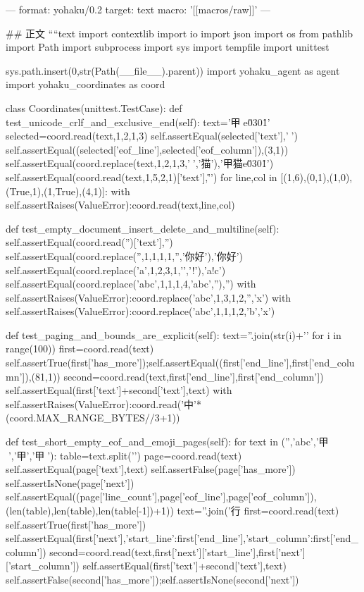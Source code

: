 ---
format: yohaku/0.2
target: text
macro: '[[macros/raw]]'
---

## 正文
````text
import contextlib
import io
import json
import os
from pathlib import Path
import subprocess
import sys
import tempfile
import unittest

sys.path.insert(0,str(Path(__file__).parent))
import yohaku_agent as agent
import yohaku_coordinates as coord


class Coordinates(unittest.TestCase):
    def test_unicode_crlf_and_exclusive_end(self):
        text='甲🧸e\u0301\r{}\n'
        selected=coord.read(text,1,2,1,3)
        self.assertEqual(selected['text'],'🧸')
        self.assertEqual((selected['eof_line'],selected['eof_column']),(3,1))
        self.assertEqual(coord.replace(text,1,2,1,3,'🧸','猫'),'甲猫e\u0301\r{}\n')
        self.assertEqual(coord.read(text,1,5,2,1)['text'],'\r\n')
        for line,col in [(1,6),(0,1),(1,0),(True,1),(1,True),(4,1)]:
            with self.assertRaises(ValueError):coord.read(text,line,col)

    def test_empty_document_insert_delete_and_multiline(self):
        self.assertEqual(coord.read('')['text'],'')
        self.assertEqual(coord.replace('',1,1,1,1,'','你好\n'),'你好\n')
        self.assertEqual(coord.replace('a\nb\nc',1,2,3,1,'\nb\n','!'),'a!c')
        self.assertEqual(coord.replace('abc',1,1,1,4,'abc',''),'')
        with self.assertRaises(ValueError):coord.replace('abc',1,3,1,2,'','x')
        with self.assertRaises(ValueError):coord.replace('abc',1,1,1,2,'b','x')

    def test_paging_and_bounds_are_explicit(self):
        text=''.join(str(i)+'\n' for i in range(100))
        first=coord.read(text)
        self.assertTrue(first['has_more']);self.assertEqual((first['end_line'],first['end_column']),(81,1))
        second=coord.read(text,first['end_line'],first['end_column'])
        self.assertEqual(first['text']+second['text'],text)
        with self.assertRaises(ValueError):coord.read('中'*(coord.MAX_RANGE_BYTES//3+1))

    def test_short_empty_eof_and_emoji_pages(self):
        for text in ('','abc','甲🧸','甲\n','甲🧸\n'):
            table=text.split('\n')
            page=coord.read(text)
            self.assertEqual(page['text'],text)
            self.assertFalse(page['has_more'])
            self.assertIsNone(page['next'])
            self.assertEqual((page['line_count'],page['eof_line'],page['eof_column']),
                             (len(table),len(table),len(table[-1])+1))
        text=''.join('行%
        first=coord.read(text)
        self.assertTrue(first['has_more'])
        self.assertEqual(first['next'],{'start_line':first['end_line'],'start_column':first['end_column']})
        second=coord.read(text,first['next']['start_line'],first['next']['start_column'])
        self.assertEqual(first['text']+second['text'],text)
        self.assertFalse(second['has_more']);self.assertIsNone(second['next'])

